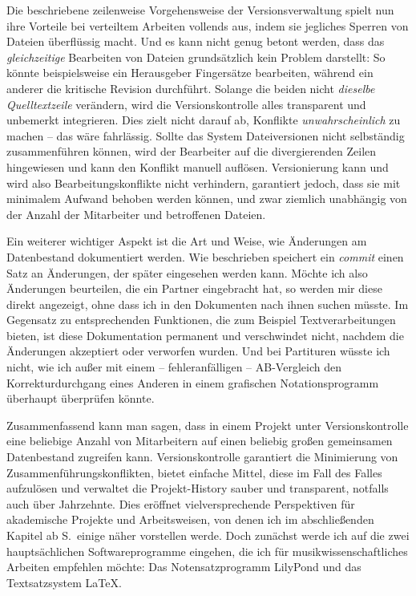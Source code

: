 \documentclass[DIV=12]{scrreprt}
\begin{document}
Die beschriebene zeilenweise Vorgehensweise der Versionsverwaltung spielt nun ihre Vorteile bei verteiltem Arbeiten vollends aus, indem sie jegliches Sperren von Dateien überflüssig macht.
Und es kann nicht genug betont werden, dass das \emph{gleichzeitige} Bearbeiten von Dateien grundsätzlich kein Problem darstellt:
So könnte beispielsweise ein Herausgeber Fingersätze bearbeiten, während ein anderer die kritische Revision durchführt.
Solange die beiden nicht \emph{dieselbe Quelltextzeile} verändern, wird die Versionskontrolle alles transparent und unbemerkt integrieren.
Dies zielt nicht darauf ab, Konflikte \emph{unwahrscheinlich} zu machen -- das wäre fahrlässig.
Sollte das System Dateiversionen nicht selbständig zusammenführen können, wird der Bearbeiter auf die divergierenden Zeilen hingewiesen und kann den Konflikt manuell auflösen.
Versionierung kann und wird also Bearbeitungskonflikte nicht verhindern, garantiert jedoch, dass sie mit minimalem Aufwand behoben werden können, und zwar ziemlich unabhängig von der Anzahl der Mitarbeiter und betroffenen Dateien.

\medskip
Ein weiterer wichtiger Aspekt ist die Art und Weise, wie Änderungen am Datenbestand dokumentiert werden.
Wie beschrieben speichert ein \emph{commit} einen Satz an Änderungen, der später eingesehen werden kann.
Möchte ich also Änderungen beurteilen, die ein Partner eingebracht hat, so werden mir diese direkt angezeigt, ohne dass ich in den Dokumenten nach ihnen suchen müsste.
Im Gegensatz zu entsprechenden Funktionen, die zum Beispiel Textverarbeitungen bieten, ist diese Dokumentation permanent und verschwindet nicht, nachdem die Änderungen akzeptiert oder verworfen wurden.
Und bei Partituren wüsste ich nicht, wie ich außer mit einem -- fehleranfälligen -- AB-Vergleich den Korrekturdurchgang eines Anderen in einem grafischen Notationsprogramm überhaupt überprüfen könnte.


\medskip
Zusammenfassend kann man sagen, dass in einem Projekt unter Versionskontrolle eine beliebige Anzahl von Mitarbeitern auf einen beliebig großen gemeinsamen Datenbestand zugreifen kann.
Versionskontrolle garantiert die Minimierung von Zusammenführungskonflikten, bietet einfache Mittel, diese im Fall des Falles aufzulösen und verwaltet die Projekt-History sauber und transparent, notfalls auch über Jahrzehnte.
Dies eröffnet vielversprechende Perspektiven für akademische Projekte und Arbeitsweisen, von denen ich im abschließenden Kapitel ab S.\,\pageref{chap:pt_applications} einige näher vorstellen werde.
Doch zunächst werde ich auf die zwei hauptsächlichen Softwareprogramme eingehen, die ich für musikwissenschaftliches Arbeiten empfehlen möchte:
Das Notensatzprogramm LilyPond und
das Textsatzsystem \LaTeX.
\end{document}
